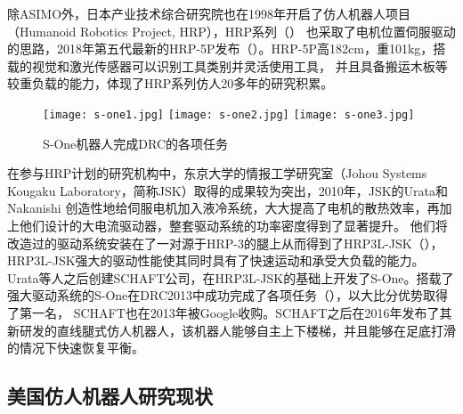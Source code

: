 除ASIMO外，日本产业技术综合研究院也在1998年开启了仿人机器人项目（Humanoid Robotics Project, HRP），HRP系列（）
也采取了电机位置伺服驱动的思路，2018年第五代最新的HRP-5P发布（）。HRP-5P高182cm，重101kg，搭载的视觉和激光传感器可以识别工具类别并灵活使用工具，
并且具备搬运木板等较重负载的能力\cite{HRP}，体现了HRP系列仿人20多年的研究积累。
\begin{figure}[htbp]
    \centering
    \texttt{[image: s-one1.jpg]}
    \texttt{[image: s-one2.jpg]}
    \texttt{[image: s-one3.jpg]}
    \caption{\label{fig:s-one}S-One机器人完成DRC的各项任务}
\end{figure}
在参与HRP计划的研究机构中，东京大学的情报工学研究室（Johou Systems Kougaku Laboratory，简称JSK）取得的成果较为突出，2010年，JSK的Urata和Nakanishi
创造性地给伺服电机加入液冷系统，大大提高了电机的散热效率，再加上他们设计的大电流驱动器，整套驱动系统的功率密度得到了显著提升。
他们将改造过的驱动系统安装在了一对源于HRP-3的腿上从而得到了HRP3L-JSK（），HRP3L-JSK强大的驱动性能使其同时具有了快速运动和承受大负载的能力。
Urata等人之后创建SCHAFT公司，在HRP3L-JSK的基础上开发了S-One。搭载了强大驱动系统的S-One在DRC2013中成功完成了各项任务（），以大比分优势取得了第一名，
SCHAFT也在2013年被Google收购。SCHAFT之后在2016年发布了其新研发的直线腿式仿人机器人，该机器人能够自主上下楼梯，并且能够在足底打滑的情况下快速恢复平衡\cite{SCHAFT}。

\subsection{美国仿人机器人研究现状}

